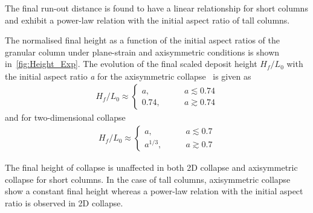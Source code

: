 The final run-out distance is found to have a linear relationship for short 
columns and exhibit a power-law relation with the initial aspect ratio of tall 
columns. 

The normalised final height as a function of the initial aspect ratios of 
the granular column under plane-strain and axisymmetric conditions is 
shown in~\cref{fig:Height_Exp}. The evolution of the final scaled deposit 
height $\textit{H}_{\textit{f}}/\textit{L}_{\textit{0}}$ with the initial 
aspect ratio \textit{a} for the axisymmetric collapse~\citep{Lajeunesse2005} 
is given as 
\begin{align}
\textit{H}_{\textit{f}}/\textit{L}_{\textit{0}} \approx 
\begin{cases}
\textit{a}, \qquad &\textit{a}\lesssim 0.74 \\
0.74, \qquad &\textit{a}\gtrsim 0.74
\end{cases}
\end{align}
and for two-dimensional collapse
\begin{align}
\textit{H}_{\textit{f}}/\textit{L}_{\textit{0}} \approx 
\begin{cases}
\textit{a}, \qquad &\textit{a}\lesssim 0.7 \\
\textit{a}^{1/3}, \qquad &\textit{a}\gtrsim 0.7
\end{cases}
\end{align}

The final height of collapse is unaffected in both 2D collapse and 
axisymmetric collapse for short columns. In the case of tall columns, 
axisymmetric collapse show a constant final height whereas a power-law 
relation with the initial aspect ratio is observed in 2D collapse.

